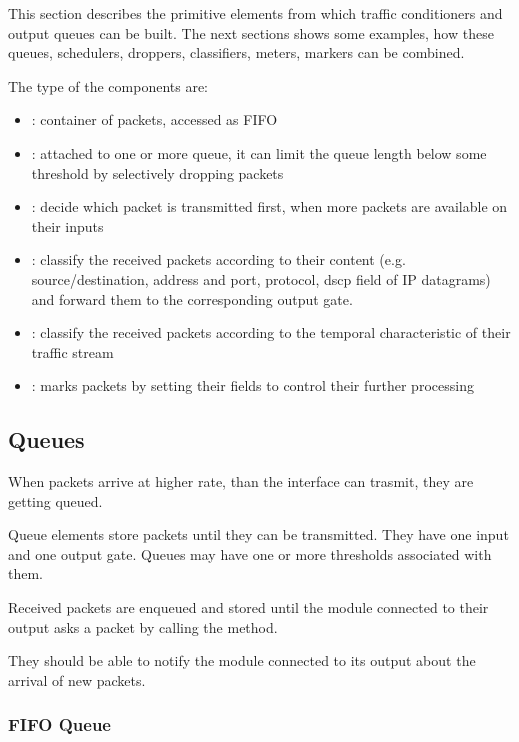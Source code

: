 This section describes the primitive elements from which traffic
conditioners and output queues can be built. The next sections
shows some examples, how these queues, schedulers, droppers,
classifiers, meters, markers can be combined.

The type of the components are:
\begin{itemize}
  \item {}: container of packets, accessed as FIFO
  \item {}: attached to one or more queue, it can
    limit the queue length below some threshold
    by selectively dropping packets
  \item {}: decide which packet is transmitted first,
     when more packets are available on their inputs
  \item {}: classify the received packets
     according to their content (e.g. source/destination,
     address and port, protocol, dscp field of IP datagrams)
     and forward them to the corresponding output gate.
  \item {}: classify the received packets
      according to the temporal characteristic of their
      traffic stream
  \item {}: marks packets by setting their fields
      to control their further processing 
\end{itemize}

\subsection{Queues}

When packets arrive at higher rate, than the interface can trasmit,
they are getting queued.


Queue elements store packets until they can be transmitted.
They have one input and one output gate.
Queues may have one or more thresholds associated with them.

 Received packets
are enqueued and stored until the module connected to their
output asks a packet by calling the 
method.

They should be able to notify the module connected to its output
about the arrival of new packets.

\subsubsection{FIFO Queue}

